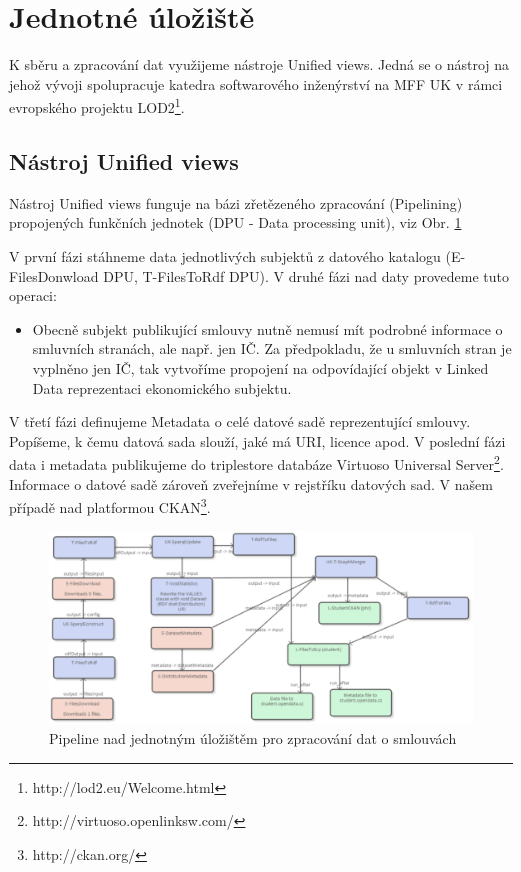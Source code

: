 

\section{Jednotné úložiště}

K sběru a zpracování dat využijeme nástroje Unified views. Jedná se o nástroj na jehož vývoji spolupracuje katedra softwarového inženýrství na MFF UK v rámci evropského projektu LOD2\footnote{http://lod2.eu/Welcome.html}.

\subsection{Nástroj Unified views}

Nástroj Unified views funguje na bázi zřetězeného zpracování (Pipelining) propojených funkčních jednotek (DPU - Data processing unit), viz Obr. \ref{obr:jednotneUloziste}

V první fázi stáhneme data jednotlivých subjektů z datového katalogu (E-FilesDonwload DPU, T-FilesToRdf DPU). V druhé fázi nad daty provedeme tuto operaci:

\begin{itemize}
\item Obecně subjekt publikující smlouvy nutně nemusí mít podrobné informace o smluvních stranách, ale např. jen IČ. Za předpokladu, že u smluvních stran je vyplněno jen IČ, tak vytvoříme propojení na odpovídající objekt v Linked Data reprezentaci ekonomického subjektu.  
\end{itemize}

V třetí fázi definujeme Metadata o celé datové sadě reprezentující smlouvy. Popíšeme, k čemu datová sada slouží, jaké má URI, licence apod. V poslední fázi data i metadata publikujeme do triplestore databáze Virtuoso Universal Server\footnote{http://virtuoso.openlinksw.com/}. Informace o datové sadě zároveň zveřejníme v rejstříku datových sad. V našem případě nad platformou CKAN\footnote{ http://ckan.org/}.

\begin{figure}[H]
\centerline{\includegraphics[width=\textwidth]{img/jednotneUloziste.eps}}
\caption{Pipeline nad jednotným úložištěm pro zpracování dat o smlouvách}
\label{obr:jednotneUloziste}
\end{figure}


